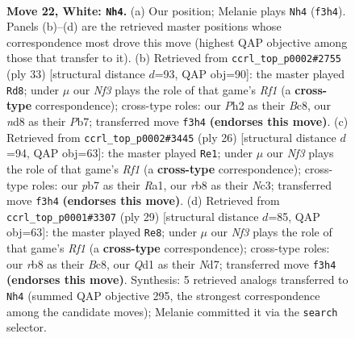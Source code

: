 \documentclass[11pt]{article}
\begin{document}
\clearpage

\begin{figure}[p]\centering
\begin{subfigure}{0.46\textwidth}\centering
\resizebox{\linewidth}{!}{%
\newchessgame
\chessboard[
  setfen={1rbnrk2/1ppp1ppp/p2q4/B2P4/4n3/4PNP1/PP2RP1P/1R1Q1BK1 w - - 19 22},
  showmover=false,
  pgfstyle=straightmove, color=movearrow, markmove={f3-h4}
]}
\caption{}
\end{subfigure}\hfill
\begin{subfigure}{0.46\textwidth}\centering
\resizebox{\linewidth}{!}{%
\newchessgame
\chessboard[
  setfen={r1b2rk1/1p2qpb1/2p1p1p1/p6p/2RPQ2P/1B2PN2/PP3PP1/R5K1 b - - 1 17},
  showmover=false,
  pgfstyle=straightmove, color=movearrow, markmove={f8-d8}
]}
\caption{}
\end{subfigure}
\\[4pt]
\begin{subfigure}{0.46\textwidth}\centering
\resizebox{\linewidth}{!}{%
\newchessgame
\chessboard[
  setfen={r1b1k2r/3p1ppp/pp2p3/2q1n3/2P1P3/2NB3P/PP3PP1/R2Q1RK1 w kq - 0 14},
  showmover=false,
  pgfstyle=straightmove, color=movearrow, markmove={f1-e1}
]}
\caption{}
\end{subfigure}\hfill
\begin{subfigure}{0.46\textwidth}\centering
\resizebox{\linewidth}{!}{%
\newchessgame
\chessboard[
  setfen={r1b2rk1/1p1nqpp1/2p4p/p3p3/2QP4/P3PN2/1P2BPPP/R1R3K1 b - - 0 15},
  showmover=false,
  pgfstyle=straightmove, color=movearrow, markmove={f8-e8}
]}
\caption{}
\end{subfigure}
\caption{\textbf{Move 22, White: \texttt{Nh4}.} (a) Our position; Melanie plays \texttt{Nh4} (\texttt{f3h4}). Panels (b)--(d) are the retrieved master positions whose correspondence most drove this move (highest QAP objective among those that transfer to it). (b) Retrieved from \texttt{ccrl\_top\_p0002\#2755} (ply 33) [structural distance $d$=93, QAP obj=90]: the master played \texttt{Rd8}; under $\mu$ our \emph{Nf3} plays the role of that game's \emph{Rf1} (a \textbf{cross-type} correspondence); cross-type roles: our \emph{P}h2 as their \emph{B}c8, our \emph{n}d8 as their \emph{P}b7; transferred move \texttt{f3h4} \textbf{(endorses this move)}. (c) Retrieved from \texttt{ccrl\_top\_p0002\#3445} (ply 26) [structural distance $d$=94, QAP obj=63]: the master played \texttt{Re1}; under $\mu$ our \emph{Nf3} plays the role of that game's \emph{Rf1} (a \textbf{cross-type} correspondence); cross-type roles: our \emph{p}b7 as their \emph{R}a1, our \emph{r}b8 as their \emph{N}c3; transferred move \texttt{f3h4} \textbf{(endorses this move)}. (d) Retrieved from \texttt{ccrl\_top\_p0001\#3307} (ply 29) [structural distance $d$=85, QAP obj=63]: the master played \texttt{Re8}; under $\mu$ our \emph{Nf3} plays the role of that game's \emph{Rf1} (a \textbf{cross-type} correspondence); cross-type roles: our \emph{r}b8 as their \emph{B}c8, our \emph{Q}d1 as their \emph{N}d7; transferred move \texttt{f3h4} \textbf{(endorses this move)}. Synthesis: 5 retrieved analogs transferred to \texttt{Nh4} (summed QAP objective 295, the strongest correspondence among the candidate moves); Melanie committed it via the \texttt{search} selector.}
\label{fig:thought-m42}
\end{figure}
\end{document}
